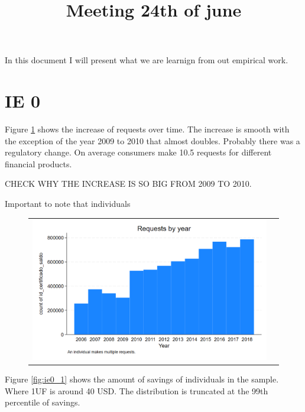 \documentclass[12pt]{article}
\begin{document}
\title{Meeting 24th of june}

\maketitle

In this document I will present what we are learnign from out empirical work. 

\section{IE 0}

Figure \ref{fig:ie0_0} shows the increase of requests over time. The increase is smooth with the exception of the year 2009 to 2010 that almost doubles. Probably there was a regulatory change. 
On average consumers make 10.5 requests for different financial products. 

CHECK WHY THE INCREASE IS SO BIG FROM 2009 TO 2010.

Important to note that individuals 
\begin{figure}[H]
\caption{}
\label{fig:ie0_0}
\centering{}%
\begin{tabular}{cc}
\includegraphics[scale=0.27]{figures/IE0_plot0.png}
\end{tabular}
\end{figure}


Figure \ref{fig:ie0_1} shows the amount of savings of individuals in the sample. Where 1UF is around 40 USD. The distribution is truncated at the 99th percentile of savings. 
\end{document}
